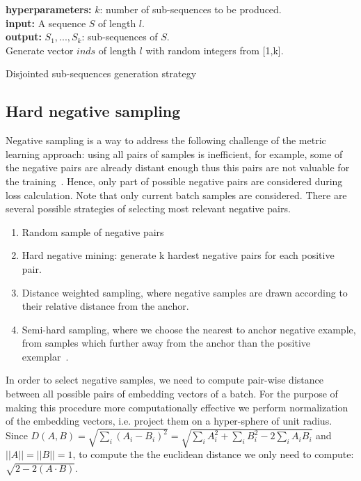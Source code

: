 \documentclass{article}
\begin{document}
\begin{algorithm}
\SetAlgoLined
\textbf{hyperparameters:} $k$: number of sub-sequences to be produced. \\
\textbf{input:} A sequence $S$ of length $l$. \\
\textbf{output:} $S_1,...,S_k$: sub-sequences of $S$. \\

\BlankLine
Generate vector $inds$ of length $l$ with random integers from [1,k].\\
\caption{Disjointed sub-sequences generation strategy}
\label{alg-disj-ss}

\end{algorithm}




\subsection{Hard negative sampling} \label{sec-neg-samples}

Negative sampling is a way to address the following challenge of the metric learning approach: using all pairs of samples is inefficient, for example, some of the negative pairs are already distant enough thus this pairs are not valuable for the training~\cite{SimoSerra2015DiscriminativeLO, Manmatha2017SamplingMI, Schroff2015FaceNetAU}. Hence, only part of possible negative pairs are considered during loss calculation. Note that only current batch samples are considered. There are several possible strategies of selecting most relevant negative pairs.

\begin{enumerate}
    \item Random sample of negative pairs
    \item Hard negative mining: generate k hardest negative pairs for each positive pair.
    \item Distance weighted sampling, where negative samples are drawn according to their relative distance from the anchor.~\cite{Manmatha2017SamplingMI}
    \item Semi-hard sampling, where we choose the nearest to anchor negative example, from samples which further away from the anchor than the positive exemplar~\cite{Schroff2015FaceNetAU}.
\end{enumerate}

In order to select negative samples, we need to compute pair-wise distance between all possible pairs of embedding vectors of a batch. For the purpose of making this procedure more computationally effective we perform normalization of the embedding vectors, i.e. project them on a hyper-sphere of unit radius. Since $D(A,B) = \sqrt{\sum_i(A_i - B_i)^2} = \sqrt{\sum_i A_i^2 + \sum_i B_i^2 - 2\sum_i A_i B_i} $ and $||A||= ||B||=1$, to compute the the euclidean distance we only need to compute: $\sqrt{2 - 2(A \cdot B)}$.
\end{document}
